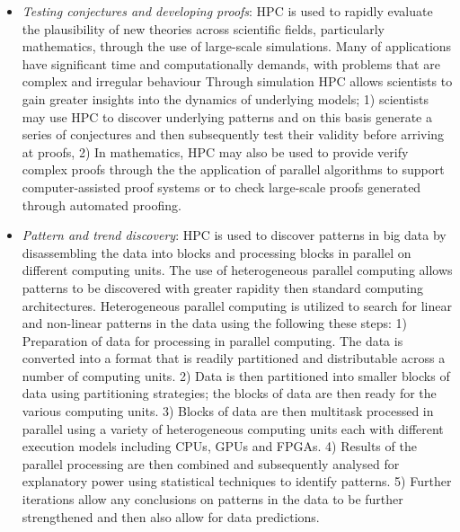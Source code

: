 \documentclass[10pt]{article}[draft]
\begin{document}
\begin{itemize}
	
	
	\item \emph{Testing conjectures and developing proofs}: HPC is used to rapidly evaluate the plausibility of new theories across scientific fields, particularly mathematics, through the use of large-scale simulations. Many of  applications have significant time and computationally demands, with problems that are complex and irregular behaviour Through simulation HPC allows scientists  to gain greater insights into the dynamics of underlying models; 1) scientists may use HPC to discover underlying patterns and on this basis generate a series of conjectures and then subsequently test their validity before arriving at proofs, 2) In mathematics, HPC may also be used to provide verify complex proofs through the the application of parallel algorithms to support computer-assisted proof systems or to check large-scale proofs generated through automated proofing. 
	
	
	
	\item \emph{Pattern and trend discovery}: HPC is used to discover patterns in big data by disassembling the data into blocks and processing blocks in parallel on different computing units. The use of heterogeneous parallel computing allows patterns to be discovered with greater rapidity then standard computing architectures. Heterogeneous parallel computing is utilized to search for linear and non-linear patterns in the data using the following these steps: 1) Preparation of  data for processing in parallel computing. The data is converted into a format that is readily partitioned and distributable across a number of computing units. 2) Data is then partitioned into smaller blocks of data using partitioning strategies; the blocks of data are then ready for the various computing units.  3) Blocks of data are then multitask processed in parallel using a variety of heterogeneous computing units each with different execution models including CPUs, GPUs and FPGAs.  4) Results of the parallel processing are then combined and subsequently analysed for explanatory power using statistical techniques to identify patterns. 5) Further iterations allow any conclusions on patterns in the data to be further strengthened and then also allow for data predictions. 
	

\end{itemize}
\end{document}
